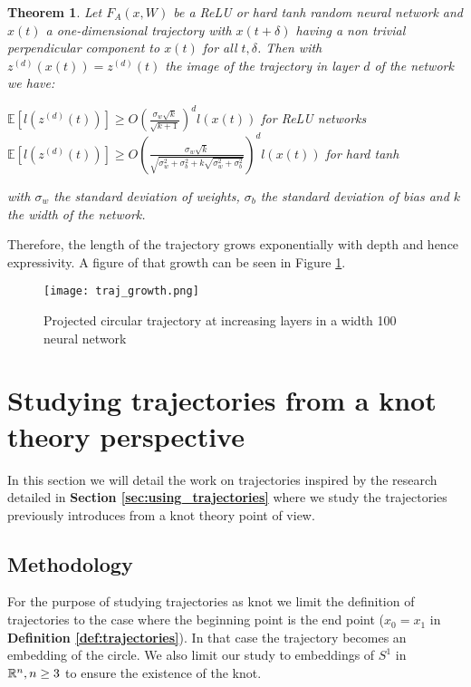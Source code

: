 \documentclass[12pt, a4paper]{article}
\newtheorem{theorem}{Theorem}
\begin{document}
\begin{theorem}
  Let $F_A(x,W)$ be a ReLU or hard tanh random neural network and $x(t)$ a one-dimensional trajectory with $x(t + \delta)$ having a non trivial perpendicular component to $x(t)$ for all $t,\delta$. Then with $z^{(d)}(x(t)) = z^{(d)}(t)$ the image of the trajectory in layer $d$ of the network we have:
  \begin{center}
    $\mathbb{E}[l(z^{(d)}(t))] \ge O(\frac{\sigma_w \sqrt{k}}{\sqrt{k+1}})^d l(x(t))$ for ReLU networks\\
    $\mathbb{E}[l(z^{(d)}(t))] \ge O(\frac{\sigma_w \sqrt{k}}{\sqrt{\sigma_w^2 + \sigma_b^2 + k\sqrt{\sigma_w^2 + \sigma_b^2}}})^d l(x(t))$ for hard tanh
  \end{center}
  with $\sigma_w$ the standard deviation of weights, $\sigma_b$ the standard deviation of bias and $k$ the width of the network.
\end{theorem}

Therefore, the length of the trajectory grows exponentially with depth and hence expressivity. A figure of that growth can be seen in Figure \ref{fig:traj_growth}.

\begin{figure}[H]
  \centering
  \texttt{[image: traj\_growth.png]}
  \caption{Projected circular trajectory at increasing layers in a width 100 neural network}
  \label{fig:traj_growth}
\end{figure}

\newpage
\thispagestyle{empty}
\mbox{}
\newpage

\section{Studying trajectories from a knot theory perspective}

In this section we will detail the work on trajectories inspired by the research detailed in \textbf{Section \ref{sec:using_trajectories}} where we study the trajectories previously introduces from a knot theory point of view.

\subsection{Methodology}

For the purpose of studying trajectories as knot we limit the definition of trajectories to the case where the beginning point is the end point ($x_0 = x_1$ in \textbf{Definition \ref{def:trajectories}}). In that case the trajectory becomes an embedding of the circle. We also limit our study to embeddings of $S^1$ in $\mathbb{R}^n, n \ge 3$ to ensure the existence of the knot.\\ 
\end{document}

